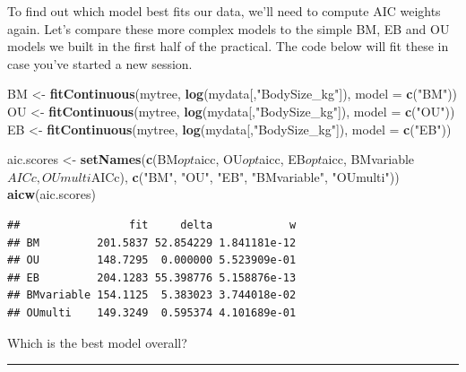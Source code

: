 \documentclass[]{book}
\newenvironment{Shaded}{\begin{snugshade}}{\end{snugshade}}
\newcommand{\KeywordTok}[1]{\textcolor[rgb]{0.13,0.29,0.53}{\textbf{{#1}}}}
\newcommand{\DataTypeTok}[1]{\textcolor[rgb]{0.13,0.29,0.53}{{#1}}}
\newcommand{\StringTok}[1]{\textcolor[rgb]{0.31,0.60,0.02}{{#1}}}
\newcommand{\NormalTok}[1]{{#1}}
\theoremstyle{definition}
\theoremstyle{definition}
\theoremstyle{definition}
\theoremstyle{remark}
\begin{document}
To find out which model best fits our data, we'll need to compute AIC
weights again. Let's compare these more complex models to the simple BM,
EB and OU models we built in the first half of the practical. The code
below will fit these in case you've started a new session.

\begin{Shaded}
\begin{Highlighting}[]
\NormalTok{BM <-}\StringTok{ }\KeywordTok{fitContinuous}\NormalTok{(mytree, }\KeywordTok{log}\NormalTok{(mydata[,}\StringTok{"BodySize_kg"}\NormalTok{]), }\DataTypeTok{model =} \KeywordTok{c}\NormalTok{(}\StringTok{"BM"}\NormalTok{))}
\NormalTok{OU <-}\StringTok{ }\KeywordTok{fitContinuous}\NormalTok{(mytree, }\KeywordTok{log}\NormalTok{(mydata[,}\StringTok{"BodySize_kg"}\NormalTok{]), }\DataTypeTok{model =} \KeywordTok{c}\NormalTok{(}\StringTok{"OU"}\NormalTok{))}
\NormalTok{EB <-}\StringTok{ }\KeywordTok{fitContinuous}\NormalTok{(mytree, }\KeywordTok{log}\NormalTok{(mydata[,}\StringTok{"BodySize_kg"}\NormalTok{]), }\DataTypeTok{model =} \KeywordTok{c}\NormalTok{(}\StringTok{"EB"}\NormalTok{))}
\end{Highlighting}
\end{Shaded}

\begin{Shaded}
\begin{Highlighting}[]
\NormalTok{aic.scores <-}\StringTok{ }\KeywordTok{setNames}\NormalTok{(}\KeywordTok{c}\NormalTok{(BM$opt$aicc, OU$opt$aicc, EB$opt$aicc, BMvariable$AICc, OUmulti$AICc), }
                       \KeywordTok{c}\NormalTok{(}\StringTok{"BM"}\NormalTok{, }\StringTok{"OU"}\NormalTok{, }\StringTok{"EB"}\NormalTok{, }\StringTok{"BMvariable"}\NormalTok{, }\StringTok{"OUmulti"}\NormalTok{))}
\KeywordTok{aicw}\NormalTok{(aic.scores)}
\end{Highlighting}
\end{Shaded}

\begin{verbatim}
##                 fit     delta            w
## BM         201.5837 52.854229 1.841181e-12
## OU         148.7295  0.000000 5.523909e-01
## EB         204.1283 55.398776 5.158876e-13
## BMvariable 154.1125  5.383023 3.744018e-02
## OUmulti    149.3249  0.595374 4.101689e-01
\end{verbatim}

Which is the best model overall?

\begin{center}\rule{0.5\linewidth}{\linethickness}\end{center}
\end{document}
